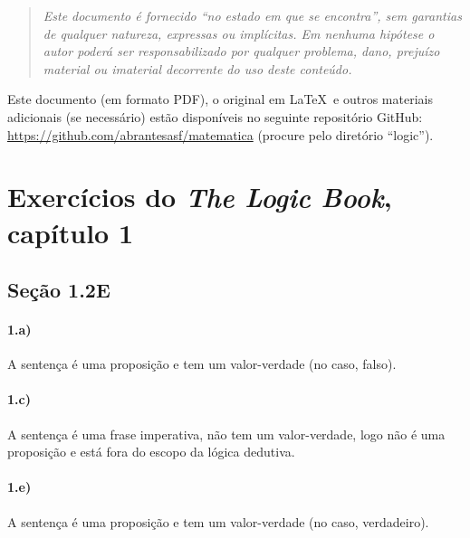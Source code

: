 \documentclass[pdftex,a4paper,12pt,brazil]{article} %
\begin{document}
\begin{quote}
  \emph{Este documento é fornecido ``no estado em que se encontra'', sem garantias de qualquer
    natureza, expressas ou implícitas. Em nenhuma hipótese o autor poderá ser responsabilizado
    por qualquer problema, dano, prejuízo material ou imaterial decorrente do uso deste
    conteúdo.}
\end{quote}

Este documento (em formato PDF), o original em \LaTeX\ e outros materiais
adicionais (se necessário) estão disponíveis no seguinte
repositório GitHub: \url{https://github.com/abrantesasf/matematica} (procure pelo
diretório ``logic'').


\section{Exercícios do \emph{The Logic Book}, capítulo 1}
\label{tlb-1}


\subsection{Seção 1.2E}
\label{tlb-1-12e}

\paragraph{1.a)} A sentença é uma proposição e tem um valor-verdade (no caso, falso).

\paragraph{1.c)} A sentença é uma frase imperativa, não tem um valor-verdade, logo não é
uma proposição e está fora do escopo da lógica dedutiva.

\paragraph{1.e)} A sentença é uma proposição e tem um valor-verdade (no caso, verdadeiro).
\end{document}
